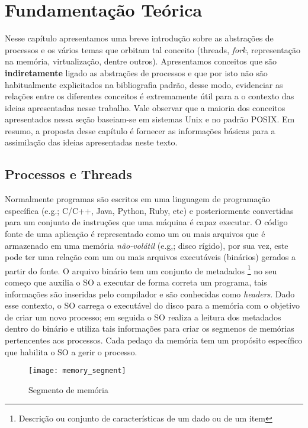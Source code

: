 \chapter{Fundamentação Teórica}

Nesse capítulo apresentamos uma breve introdução sobre as abstrações de
processos e os vários temas que orbitam tal conceito (threads, \emph{fork},
representação na memória, virtualização, dentre outros). Apresentamos conceitos
que são \textbf{indiretamente} ligado as abstrações de processos e que por isto
não são habitualmente explicitados na bibliografia padrão, desse modo,
evidenciar as relações entre os diferentes conceitos é extremamente útil para a
o contexto das ideias apresentadas nesse trabalho. Vale observar que a maioria
dos conceitos apresentados nessa seção baseiam-se em sistemas Unix e no padrão
POSIX. Em resumo, a proposta desse capítulo é fornecer as informações básicas
para a assimilação das ideias apresentadas neste texto.

\label{cap:fundamentacao-teorica}

\section{Processos e Threads}
\label{sec:processos-e-threads}

Normalmente programas são escritos em uma linguagem de programação específica
(e.g.; C/C++, Java, Python, Ruby, etc) e posteriormente convertidas para um
conjunto de instruções que uma máquina é capaz executar. O código fonte de uma
aplicação é representado como um ou mais arquivos que é armazenado em uma
memória \emph{não-volátil} (e.g,; disco rígido), por sua vez, este pode ter uma
relação com um ou mais arquivos executáveis (binários) gerados a partir do
fonte. O arquivo binário tem um conjunto de metadados \footnote{Descrição ou
conjunto de características de um dado ou de um item} no seu começo que auxilia
o SO a executar de forma correta um programa, tais informações são inseridas
pelo compilador e são conhecidas como \emph{headers}. Dado esse contexto, o SO
carrega o executável do disco para a memória com o objetivo de criar um novo
processo; em seguida o SO realiza a leitura dos metadados dentro do binário e
utiliza tais informações para criar os segmenos de memórias pertencentes aos
processos. Cada pedaço da memória tem um propósito específico que habilita
o SO a gerir o processo.

\begin{figure}[!h]
  \centering
  \texttt{[image: memory\_segment]} 
  \caption{Segmento de memória}
  \label{fig:memory_segment} 
\end{figure}

